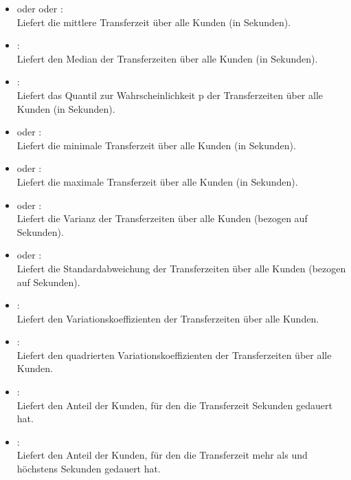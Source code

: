\begin{itemize}

\item
{} oder  oder :\\
Liefert die mittlere Transferzeit über alle Kunden (in Sekunden).

\item
{}:\\
Liefert den Median der Transferzeiten über alle Kunden (in Sekunden).

\item
{}:\\
Liefert das Quantil zur Wahrscheinlichkeit p der Transferzeiten über alle Kunden (in Sekunden).

\item
{} oder :\\
Liefert die minimale Transferzeit über alle Kunden (in Sekunden).

\item
{} oder :\\
Liefert die maximale Transferzeit über alle Kunden (in Sekunden).

\item
{} oder :\\
Liefert die Varianz der Transferzeiten über alle Kunden (bezogen auf Sekunden).

\item
{} oder :\\
Liefert die Standardabweichung der Transferzeiten über alle Kunden (bezogen auf Sekunden).

\item
{}:\\
Liefert den Variationskoeffizienten der Transferzeiten über alle Kunden.

\item
{}:\\
Liefert den quadrierten Variationskoeffizienten der Transferzeiten über alle Kunden.

\item
{}:\\
Liefert den Anteil der Kunden, für den die Transferzeit  Sekunden gedauert hat.

\item
{}:\\
Liefert den Anteil der Kunden, für den die Transferzeit mehr als  und höchstens  Sekunden gedauert hat.

\end{itemize}  



